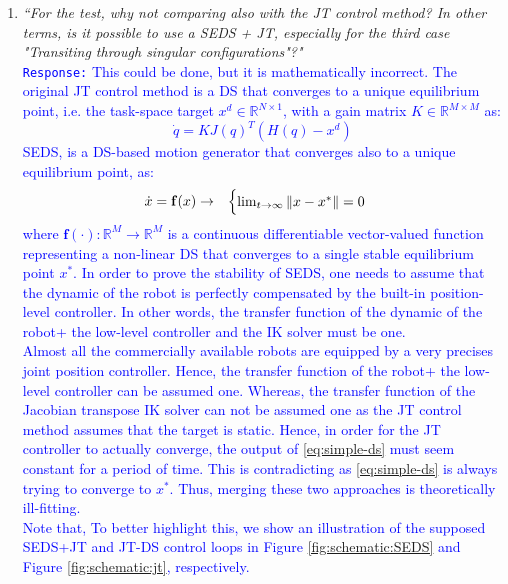 \documentclass[10pt,stdletter,dateno]{newlfm}
\begin{document}
\begin{newlfm}
\begin{enumerate}
\item \textit{``For the test, why not comparing also with the JT control method? In
other terms, is it possible to use a SEDS + JT, especially for the
third case "Transiting through singular configurations"?"}\\
\textcolor{blue}{\texttt{Response:} \small This could be done, but it is mathematically incorrect. The original JT control method is a DS that converges to a unique equilibrium point, i.e. the task-space target $x^d\in \mathbb{R}^{N\times 1}$, with a gain matrix $K \in \mathbb{R}^{M\times M}$ as:\begin{equation}
\dot{q} = K J(q)^T(H(q)- x^d) 
\label{eq:JT}
\end{equation}
SEDS, is a DS-based motion generator that converges also to a unique equilibrium point, as:
\begin{equation}
\hfill \begin{aligned}
&  \dot{x}  = \mathbf{f}(x)
\rightarrow  &
\begin{cases}
\lim_{t \rightarrow \infty}\|x - x^*\|=0
\end{cases}
\end{aligned}  \hfill
\label{eq:simple-ds}
\end{equation}
where $\mathbf{f}(\cdot): \mathbb{R}^M \rightarrow \mathbb{R}^M$ is a continuous differentiable vector-valued function representing a non-linear DS that converges to a single stable equilibrium point $x^*$. In order to prove the stability of SEDS, one needs to assume that the dynamic of the robot is perfectly compensated by the built-in position-level controller. In other words, the transfer function of the dynamic of the robot+ the low-level controller and the IK solver must be one. \\
Almost all the commercially available robots are equipped by a very precises joint position controller. Hence, the transfer function of the robot+ the low-level controller can be assumed one. Whereas, the transfer function of the Jacobian transpose IK solver can not be assumed one as the JT control method assumes that the target is static. Hence, in order for the JT controller to actually converge, the output of \eqref{eq:simple-ds} must seem constant for a period of time. This is contradicting as \eqref{eq:simple-ds} is always trying to converge to $x^*$. Thus, merging these two approaches is theoretically ill-fitting.\\
 Note that,  To better highlight this, we show an illustration of the supposed SEDS+JT and JT-DS control loops in Figure \ref{fig:schematic:SEDS} and  Figure \ref{fig:schematic:jt}, respectively.}\\




\end{enumerate}
\end{newlfm}
\end{document}
